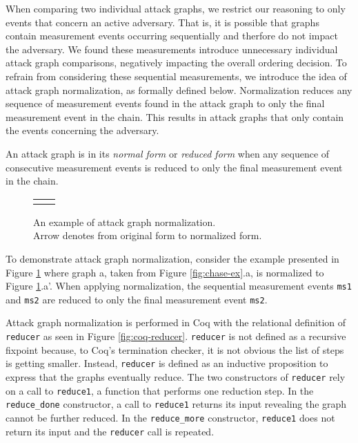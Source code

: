 \documentclass[runningheads]{llncs}
\theoremstyle{definition}
\begin{document}
When comparing two individual attack graphs, we restrict our reasoning to only events that concern an active adversary. That is, it is possible that graphs contain measurement events occurring sequentially and therfore do not impact the adversary. We found these measurements introduce unnecessary individual attack graph comparisons, negatively impacting the overall ordering decision. To refrain from considering these sequential measurements, we introduce the idea of attack graph normalization, as formally defined below. Normalization reduces any sequence of measurement events found in the attack graph to only the final measurement event in the chain. This results in attack graphs that only contain the events concerning the adversary. 

\begin{definition}
    An attack graph is in its \emph{normal form} or \emph{reduced form} when any sequence of consecutive measurement events is reduced to only the final measurement event in the chain. 
\end{definition}

\begin{figure}[htbp]
    \centering 
    \begin{tabular}{c c}
         &  
    \end{tabular}
    \captionsetup{justification=centering,margin=1cm}
    \caption[Example of attack graph normalization]{An example of attack graph normalization. \\ Arrow denotes from original form to normalized form.}
    \label{fig:reduce-ex}
\end{figure}
\noindent To demonstrate attack graph normalization, consider the example presented in Figure \ref{fig:reduce-ex} where graph a, taken from Figure \ref{fig:chase-ex}.a, is normalized to Figure \ref{fig:reduce-ex}.a'. When applying normalization, the sequential measurement events \texttt{ms1} and \texttt{ms2} are reduced to only the final measurement event \texttt{ms2}. 


Attack graph normalization is performed in Coq with the relational definition of \texttt{reducer} as seen in Figure \ref{fig:coq-reducer}. \texttt{reducer} is not defined as a recursive fixpoint because, to Coq's termination checker, it is not obvious the list of steps is getting smaller. Instead, \texttt{reducer} is defined as an inductive proposition to express that the graphs eventually reduce. The two constructors of \texttt{reducer} rely on a call to \texttt{reduce1}, a function that performs one reduction step. In the \texttt{reduce\_done} constructor, a call to \texttt{reduce1} returns its input revealing the graph cannot be further reduced. In the \texttt{reduce\_more} constructor, \texttt{reduce1} does not return its input and the \texttt{reducer} call is repeated.
\end{document}

